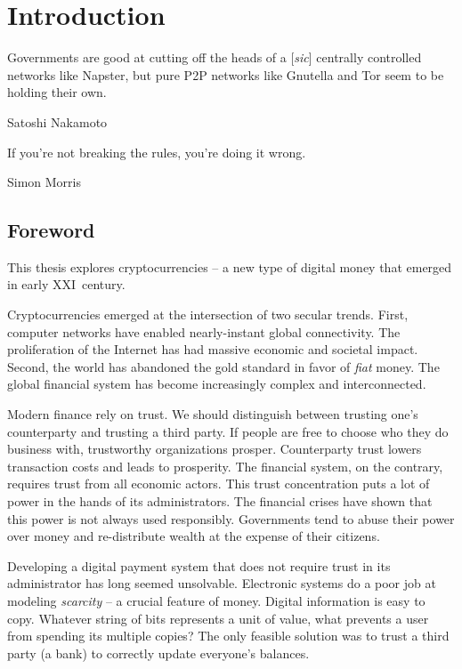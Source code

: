 \chapter{Introduction}

\label{Chapter01Introduction}

\epigraph{Governments are good at cutting off the heads of a [\textit{sic}] centrally controlled networks like Napster, but pure P2P networks like Gnutella and Tor seem to be holding their own.}{Satoshi Nakamoto~\cite{Nakamoto2008}}
\epigraph{If you're not breaking the rules, you're doing it wrong.}{Simon Morris~\cite{Morris2018}}


\section{Foreword}

This thesis explores cryptocurrencies -- a new type of digital money that emerged in early XXI~century.

Cryptocurrencies emerged at the intersection of two secular trends.
First, computer networks have enabled nearly-instant global connectivity.
The proliferation of the Internet has had massive economic and societal impact.
Second, the world has abandoned the gold standard in favor of \textit{fiat} money.
The global financial system has become increasingly complex and interconnected.

Modern finance rely on trust.
We should distinguish between trusting one's counterparty and trusting a third party.
If people are free to choose who they do business with, trustworthy organizations prosper.
Counterparty trust lowers transaction costs and leads to prosperity.
The financial system, on the contrary, requires trust from all economic actors.
This trust concentration puts a lot of power in the hands of its administrators.
The financial crises have shown that this power is not always used responsibly.
Governments tend to abuse their power over money and re-distribute wealth at the expense of their citizens.

Developing a digital payment system that does not require trust in its administrator has long seemed unsolvable.
Electronic systems do a poor job at modeling \textit{scarcity} -- a crucial feature of money.
Digital information is easy to copy.
Whatever string of bits represents a unit of value, what prevents a user from spending its multiple copies?
The only feasible solution was to trust a third party (a bank) to correctly update everyone's balances.

